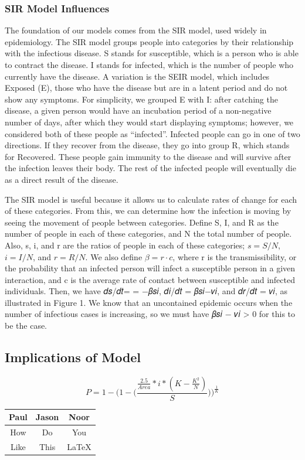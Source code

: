 \documentclass[11pt]{article}
\begin{document}
\subsubsection{SIR Model Influences}

The foundation of our models comes from the SIR model, used widely in epidemiology. The SIR model groups people into categories by their relationship with the infectious disease. S stands for susceptible, which is a person who is able to contract the disease. I stands for infected, which is the number of people who currently have the disease. A variation is the SEIR model, which includes Exposed (E), those who have the disease but are in a latent period and do not show any symptoms. For simplicity, we grouped E with I: after catching the disease, a given person would have an incubation period of a non-negative number of days, after which they would start displaying symptoms; however, we considered both of these people as “infected”. Infected people can go in one of two directions. If they recover from the disease, they go into group R, which stands for Recovered. These people gain immunity to the disease and will survive after the infection leaves their body. The rest of the infected people will eventually die as a direct result of the disease.

The SIR model is useful because it allows us to calculate rates of change for each of these categories. From this, we can determine how the infection is moving by seeing the movement of people between categories. Define S, I, and R as the number of people in each of these categories, and N the total number of people. Also, s, i, and r are the ratios of people in each of these categories; \(s=S/N\), \(i=I/N\), and \(r=R/N\). We also define \(\beta = r·c\), where r is the transmissibility, or the probability that an infected person will infect a susceptible person in a given interaction, and c is the average rate of contact between susceptible and infected individuals. Then, we have 𝑑𝑠/𝑑𝑡= = −𝛽𝑠𝑖, 𝑑𝑖/𝑑𝑡 = 𝛽𝑠𝑖−𝑣𝑖, and 𝑑𝑟/𝑑𝑡 = 𝑣𝑖, as illustrated in Figure 1. We know that an uncontained epidemic occurs when the number of infectious cases is increasing, so we must have 𝛽𝑠𝑖 − 𝜈𝑖 > 0 for this to be the case.

\subsection{Implications of Model}

\begin{center}
\[
P=1-\bigg(1-\Big(\frac{\frac{2.5}{Area}*i*(K-\frac{K^2}{N})}{S}\Big)\bigg)^\frac{1}{K}
\]


\begin{tabular}{c || c | c}
\hline
Paul & Jason & Noor \\
\hline
How & Do & You \\
\hline
Like & This & LaTeX \\
\hline
\end{tabular}

\end{center}
\end{document}
